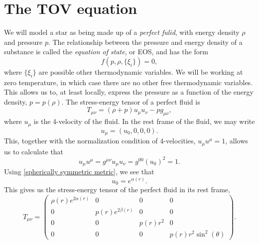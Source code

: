 \section{The TOV equation}

We will model a star as being made up of a \emph{perfect fulid}, with energy density $\rho$ and pressure $p$.
The relationship between the pressure and energy density of a substance is called the \emph{equation of state}, or EOS, and has the form
\begin{equation}
    \label{EOS}
    f(p, \rho, \{\xi_i\}) = 0,
\end{equation}
where $\{\xi_i\}$ are possible other thermodynamic variables.
We will be working at zero temperature, in which case there are no other free thermodynamic variables.
This allows us to, at least locally, express the pressure as a function of the energy density, $p = p(\rho)$.
The stress-energy tensor of a perfect fluid is
%
\begin{equation}
    T_{\mu \nu} = (\rho + p) u_\mu u_\nu - p g_{\mu \nu},
\end{equation} 
where $u_\mu$ is the 4-velocity of the fluid.
In the rest frame of the fluid, we may write 
\begin{equation}
    u_\mu = \left(u_0, 0, 0, 0\right).
\end{equation}
This, together with the normalization condition of 4-velocities, $u_\mu u^\mu = 1$, allows us to calculate that
%
\begin{equation}
    u_\mu u^\mu = g^{\mu \nu} u_\mu u_\nu = g^{00} (u_0)^2 = 1.
\end{equation}
%
Using \autoref{spherically symmetric metric}, we see that
\begin{equation}
    u_0 = e^{\alpha(r)}.
\end{equation}
%
This gives us the stress-energy tensor of the perfect fluid in its rest frame,
%
\begin{equation}
    T_{\mu \nu} 
    =
    \left(
        \begin{matrix}
            \rho{\left(r \right)} e^{2 \alpha{\left(r \right)}} & 0 & 0 & 0\\0 & 
            p{\left(r \right)} e^{2 \beta{\left(r \right)}} & 0 & 0\\
            0 & 0 & p{\left(r \right)} r^{2} & 0\\
            0 & 0 & 0 & p{\left(r \right)} r^{2} \sin^{2}{\left(\theta \right)}
        \end{matrix}
    \right).
\end{equation}
